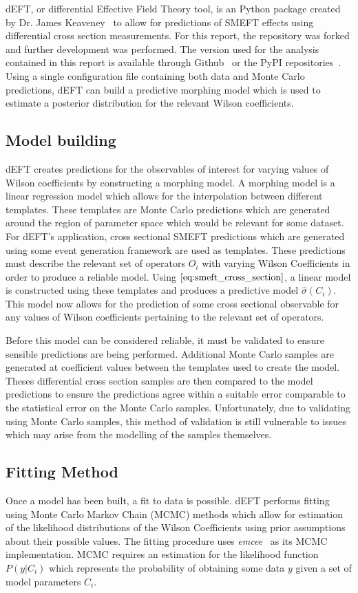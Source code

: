 \documentclass[a4paper]{article}
\begin{document}
dEFT, or differential Effective Field Theory tool, is an Python package created by Dr. James Keaveney~\cite{Keaveney_dEFT} to allow for predictions of SMEFT effects using differential cross section measurements.
For this report, the repository was forked and further development was performed.
The version used for the analysis contained in this report is available through Github~\cite{codecalec_dEFT} or the PyPI repositories~\cite{pypi_dEFT}.
Using a single configuration file containing both data and Monte Carlo predictions, dEFT can build a predictive morphing model which is used to estimate a posterior distribution for the relevant Wilson coefficients.

\subsection{Model building}
dEFT creates predictions for the observables of interest for varying values of Wilson coefficients by constructing a morphing model.
A morphing model is a linear regression model which allows for the interpolation between different templates.
These templates are Monte Carlo predictions which are generated around the region of parameter space which would be relevant for some dataset.
For dEFT's application, cross sectional SMEFT predictions which are generated using some event generation framework are used as templates.
These predictions must describe the relevant set of operators $O_{i}$ with varying Wilson Coefficients in order to produce a reliable model.
Using $\ref{eq:smeft_cross_section}$, a linear model is constructed using these templates and produces a predictive model $\hat{\sigma}({C_i})$.
This model now allows for the prediction of some cross sectional observable for any values of Wilson coefficients pertaining to the relevant set of operators.


Before this model can be considered reliable, it must be validated to ensure sensible predictions are being performed.
Additional Monte Carlo samples are generated at coefficient values between the templates used to create the model.
Theses differential cross section samples are then compared to the model predictions to ensure the predictions agree within a suitable error comparable to the statistical error on the Monte Carlo samples.
Unfortunately, due to validating using Monte Carlo samples, this method of validation is still vulnerable to issues which may arise from the modelling of the samples themselves.

\subsection{Fitting Method}\label{sec:fitting}
Once a model has been built, a fit to data is possible.
dEFT performs fitting using Monte Carlo Markov Chain (MCMC) methods which allow for estimation of the likelihood distributions of the Wilson Coefficients using prior assumptions about their possible values.
The fitting procedure uses \emph{emcee}~\cite{Foreman_Mackey_2013} as its MCMC implementation.
MCMC requires an estimation for the likelihood function $P(y | C_{i})$ which represents the probability of obtaining some data $y$ given a set of model parameters $C_{i}$.
\end{document}

